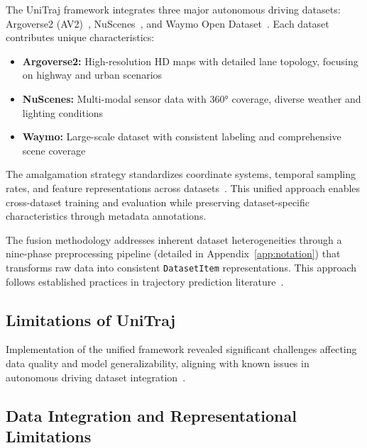 The UniTraj framework integrates three major autonomous driving datasets: Argoverse2 (AV2)~\cite{av2Wilson2023}, NuScenes~\cite{caesar2020nuscenes}, and Waymo Open Dataset~\cite{wmodSun2020}. Each dataset contributes unique characteristics:

\begin{itemize}
    \item \textbf{Argoverse2:} High-resolution HD maps with detailed lane topology, focusing on highway and urban scenarios
    \item \textbf{NuScenes:} Multi-modal sensor data with 360° coverage, diverse weather and lighting conditions
    \item \textbf{Waymo:} Large-scale dataset with consistent labeling and comprehensive scene coverage
\end{itemize}

The amalgamation strategy standardizes coordinate systems, temporal sampling rates, and feature representations across datasets~\cite{VectorNet2020, Shi2022MTR}. This unified approach enables cross-dataset training and evaluation while preserving dataset-specific characteristics through metadata annotations.

The fusion methodology addresses inherent dataset heterogeneities through a nine-phase preprocessing pipeline (detailed in Appendix~\ref{app:notation}) that transforms raw data into consistent \texttt{DatasetItem} representations. This approach follows established practices in trajectory prediction literature~\cite{zhou2022hivt, qcnetZhou2023, Shi2023MTRplusplus}.



\subsection{Limitations of UniTraj}
\label{sec:data_challenges}

Implementation of the unified framework revealed significant challenges affecting data quality and model generalizability, aligning with known issues in autonomous driving dataset integration~\cite{metadriveLi2022, scenarionetLi2023}.

\subsection{Data Integration and Representational Limitations}
\label{ssec:data_limitations}

